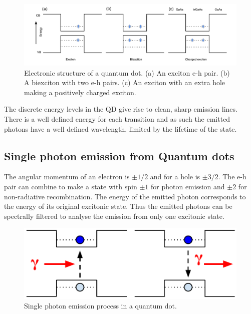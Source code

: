 \begin{figure}[h!] \begin{center}
\includegraphics[width=1\textwidth]{images/estructure.pdf} \end{center}
\caption{Electronic structure of a quantum dot. (a) An exciton e-h pair. (b) A
biexciton with two e-h pairs. (c) An exciton with an extra hole making a
positively charged exciton.} \label{fig:estructure} \end{figure}

The discrete energy levels in the QD give rise to clean, sharp emission lines.
There is a well defined energy for each transition and as such the emitted
photons have a well defined wavelength, limited by the lifetime of the state.

\subsection{Single photon emission from Quantum dots }

The angular momentum of an electron is $\pm 1/2$ and for a hole is $\pm 3/2$.
The e-h pair can combine to make a state with spin $\pm 1$ for photon emission
and $\pm 2$ for non-radiative recombination. The energy of the emitted photon
corresponds to the energy of its original excitonic state. Thus the emitted
photons can be spectrally filtered to analyse the emission from only one
excitonic state.

\begin{figure}[h!] \begin{center}
\includegraphics[width=1\textwidth]{images/qd_photon.pdf} \end{center}
\caption{Single photon emission process in a quantum dot.} \label{fig:qd_photon}
\end{figure}

